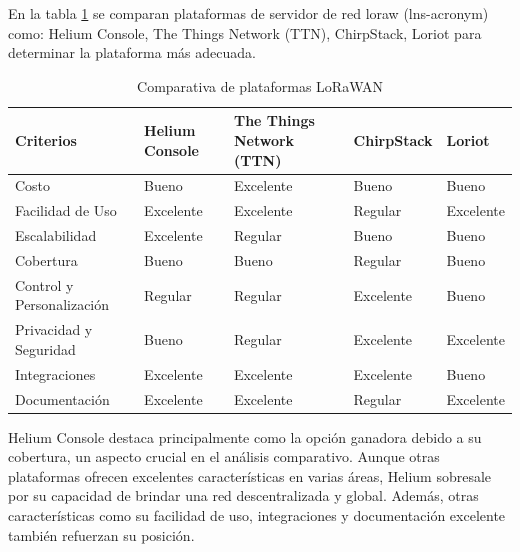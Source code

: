 En la tabla \ref{fig:Elec_lns} se comparan plataformas de servidor de red \acrshort{loraw} (\acrshort{lns-acronym}) como: Helium Console, The Things Network (TTN), ChirpStack, Loriot para determinar la plataforma más adecuada.

\begin{table}[H]
\centering
\renewcommand{\arraystretch}{1.33} %
\caption{Comparativa de plataformas LoRaWAN}
\label{fig:Elec_lns}
\begin{tabular}{|p{3cm}|p{2.5cm}|p{2.3cm}|p{2.2cm}|p{1.7cm}|}
\hline
\textbf{Criterios} & \textbf{Helium Console} & \textbf{The Things Network (TTN)} & \textbf{ChirpStack} & \textbf{Loriot} \\ \hline
Costo             & Bueno                   & Excelente                         & Bueno              & Bueno          \\ \hline
Facilidad de Uso  & Excelente               & Excelente                         & Regular            & Excelente      \\ \hline
Escalabilidad     & Excelente               & Regular                           & Bueno              & Bueno          \\ \hline
Cobertura         & Bueno                   & Bueno                             & Regular            & Bueno          \\ \hline
Control y Personalización & Regular        & Regular                           & Excelente          & Bueno          \\ \hline
Privacidad y Seguridad    & Bueno          & Regular                           & Excelente          & Excelente      \\ \hline
Integraciones     & Excelente               & Excelente                         & Excelente          & Bueno          \\ \hline
Documentación     & Excelente               & Excelente                         & Regular            & Excelente      \\ \hline
\end{tabular}
\end{table}


Helium Console destaca principalmente como la opción ganadora debido a su cobertura, un aspecto crucial en el análisis comparativo. Aunque otras plataformas ofrecen excelentes características en varias áreas, Helium sobresale por su capacidad de brindar una red descentralizada y global. Además, otras características como su facilidad de uso, integraciones y documentación excelente también refuerzan su posición.

